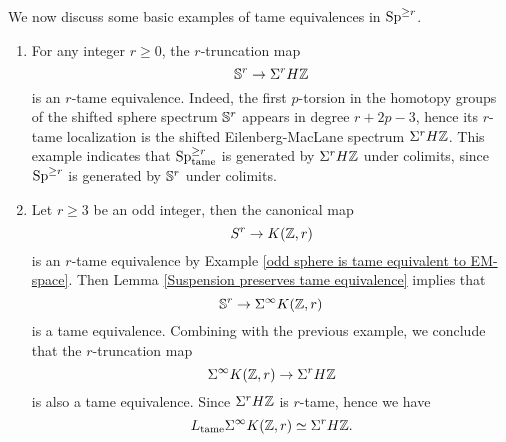 We now discuss some basic examples of tame equivalences in $\operatorname{Sp}^{\geq r}$.
\begin{example}
\label{C_tame of suspension of Eilenberg-Maclane space}
\begin{enumerate}
    \item For any integer $r\geq 0$, the $r$-truncation map
$$
{\mathbb{S}}^{r} \to \Sigma^r H{\mathbb{Z}}
$$
is an $r$-tame equivalence.
	Indeed, the first $p$-torsion in the homotopy groups of the shifted sphere spectrum ${\mathbb{S}}^{r}$ appears in degree $r+2p-3$, hence its $r$-tame localization is the shifted Eilenberg-MacLane spectrum $\Sigma^r H{\mathbb{Z}}$. 
	This example indicates that $\operatorname{Sp}^{\geq r}_{\operatorname{\operatorname{tame}}}$ is generated by $\Sigma^{r}H{\mathbb{Z}}$ under colimits, since $\operatorname{Sp}^{\geq r}$ is generated by ${\mathbb{S}}^r$ under colimits.
	
	\item Let $r\geq 3$ be an odd integer, then the canonical map
	$$
	S^{r} \to K({\mathbb{Z}}, r) 
	$$
	is an $r$-tame equivalence by Example \ref{odd sphere is tame equivalent to EM-space}. Then Lemma \ref{Suspension preserves tame equivalence} implies that 
	$$
	{\mathbb{S}}^{r} \to 
	\Sigma^{\infty}K({\mathbb{Z}}, r) 
	$$
	is a tame equivalence.
	Combining with the previous example, we conclude that the $r$-truncation map
	$$
	\Sigma^{\infty}K({\mathbb{Z}}, r) \to
	\Sigma^{r} H{\mathbb{Z}}
	$$
	is also a tame equivalence. Since $\Sigma^{r} H{\mathbb{Z}}$ is $r$-tame, hence we have 
	$$
	L_{\operatorname{\operatorname{tame}}}\Sigma^{\infty}K({\mathbb{Z}}, r)
	\simeq
	\Sigma^{r} H{\mathbb{Z}}.
	$$
\end{enumerate}
\end{example}

